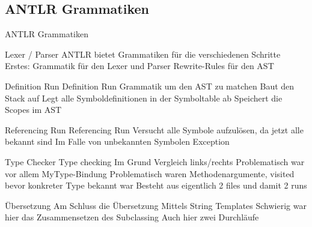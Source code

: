 \subsection{ANTLR Grammatiken}
\begin{frame}[t]{ANTLR Grammatiken}
	\begin{bigitemize}[<+->]{3mm}
		\item Lexer / Parser
		 {ANTLR bietet Grammatiken für die verschiedenen Schritte}
		 {Erstes: Grammatik für den Lexer und Parser}
		 {Rewrite-Rules für den AST}

		\item Definition Run
		 {Definition Run}
		 {Grammatik um den AST zu matchen}
		 {Baut den Stack auf}
		 {Legt alle Symboldefinitionen in der Symboltable ab}
		 {Speichert die Scopes im AST}

		\item Referencing Run
		 {Referencing Run}
		 {Versucht alle Symbole aufzulösen, da jetzt alle bekannt sind}
		 {Im Falle von unbekannten Symbolen Exception}

		\item Type Checker
		 {Type checking}
		 {Im Grund Vergleich links/rechts}
		 {Problematisch war vor allem MyType-Bindung}
		 {Problematisch waren Methodenargumente, visited bevor konkreter Type bekannt war}
		 {Besteht aus eigentlich 2 files und damit 2 runs}

		\item Übersetzung
		 {Am Schluss die Übersetzung}
		 {Mittels String Templates}
		 {Schwierig war hier das Zusammensetzen des Subclassing}
		 {Auch hier zwei Durchläufe}
	\end{bigitemize}
\end{frame}


